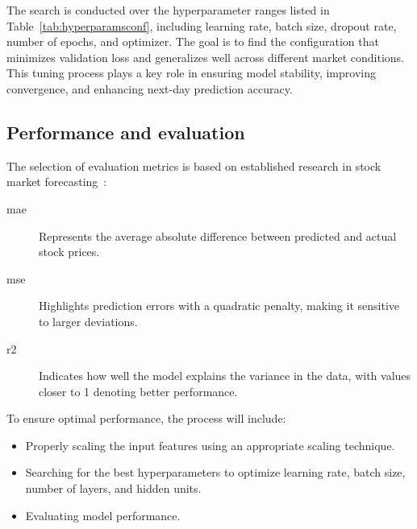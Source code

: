 The search is conducted over the hyperparameter ranges listed in Table~\ref{tab:hyperparamsconf}, including learning rate, 
batch size, dropout rate, number of epochs, and optimizer. The goal is to find the configuration that minimizes 
validation loss and generalizes well across different market conditions. This tuning process plays a key role in 
ensuring model stability, improving convergence, and enhancing next-day prediction accuracy.

\subsection{Performance and evaluation}

The selection of evaluation metrics is based on established research in stock market 
forecasting~\parencite{agrawal2022StockPrediction, nabipour2020DeepLearning, guo2024LSTMStock}:

\begin{description}
\item[\acrfull{mae}] Represents the average absolute difference between predicted and 
                     actual stock prices.
\item[\acrfull{mse}] Highlights prediction errors with a quadratic penalty, making it 
                     sensitive to larger deviations.
\item[\acrfull{r2}] Indicates how well the model explains the variance in the data, with values 
                    closer to 1 denoting better performance.
\end{description}

To ensure optimal performance, the process will include:
\begin{itemize}
    \item Properly scaling the input features using an appropriate scaling technique.
    \item Searching for the best hyperparameters to optimize learning rate, batch size, number of layers, and hidden units.
    \item Evaluating model performance.
\end{itemize}
